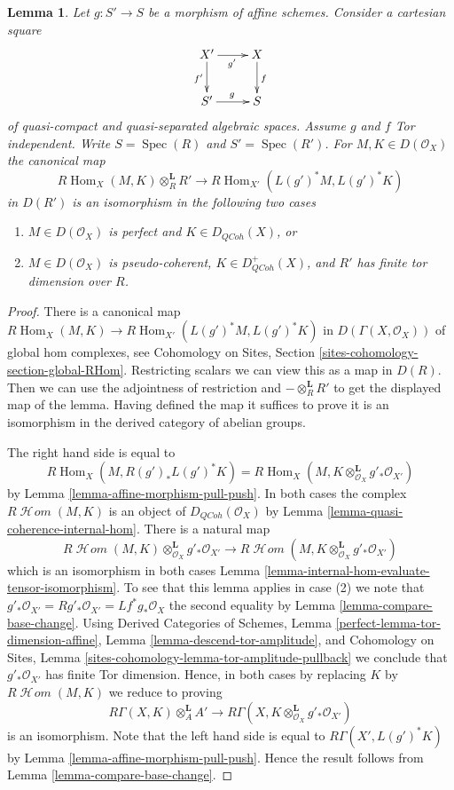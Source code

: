 \documentclass[10pt,a4paper]{amsart}
\theoremstyle{plain}
\newtheorem{lemma}[subsection]{Lemma}
\theoremstyle{definition}
\theoremstyle{remark}
\numberwithin{equation}{subsection}
\def\Spec{\mathop{\mathrm{Spec}}}
\def\Hom{\mathop{\mathrm{Hom}}\nolimits}
\def\SheafHom{\mathop{\mathcal{H}\!\mathit{om}}\nolimits}
\def\QCoh{\mathit{QCoh}}
\begin{document}
\begin{lemma}
\label{lemma-affine-morphism-and-hom-out-of-perfect}
Let $g : S' \to S$ be a morphism of affine schemes.
Consider a cartesian square
$$
\xymatrix{
X' \ar[r]_{g'} \ar[d]_{f'} & X \ar[d]^f \\
S' \ar[r]^g & S
}
$$
of quasi-compact and quasi-separated algebraic spaces. Assume $g$ and $f$
Tor independent. Write $S = \Spec(R)$ and $S' = \Spec(R')$. For
$M, K \in D(\mathcal{O}_X)$ the canonical map
$$
R\Hom_X(M, K) \otimes^\mathbf{L}_R R'
\longrightarrow
R\Hom_{X'}(L(g')^*M, L(g')^*K)
$$
in $D(R')$ is an isomorphism in the following two cases
\begin{enumerate}
\item $M \in D(\mathcal{O}_X)$ is perfect and $K \in D_\QCoh(X)$, or
\item $M \in D(\mathcal{O}_X)$ is pseudo-coherent,
$K \in D_\QCoh^+(X)$, and $R'$ has finite tor dimension over $R$.
\end{enumerate}
\end{lemma}

\begin{proof}
There is a canonical map
$R\Hom_X(M, K) \to R\Hom_{X'}(L(g')^*M, L(g')^*K)$
in $D(\Gamma(X, \mathcal{O}_X))$ of global hom complexes, see
Cohomology on Sites, Section \ref{sites-cohomology-section-global-RHom}.
Restricting scalars we can view this as a map in $D(R)$.
Then we can use the adjointness of restriction and
$- \otimes_R^\mathbf{L} R'$ to get the displayed map of the lemma.
Having defined the map it suffices to prove it is an isomorphism
in the derived category of abelian groups.

\medskip\noindent
The right hand side is equal to
$$
R\Hom_X(M, R(g')_*L(g')^*K) =
R\Hom_X(M, K \otimes_{\mathcal{O}_X}^\mathbf{L} g'_*\mathcal{O}_{X'})
$$
by Lemma \ref{lemma-affine-morphism-pull-push}. In both cases the complex
$R\SheafHom(M, K)$ is an object of $D_\QCoh(\mathcal{O}_X)$ by
Lemma \ref{lemma-quasi-coherence-internal-hom}. There is a natural map
$$
R\SheafHom(M, K) \otimes_{\mathcal{O}_X}^\mathbf{L} g'_*\mathcal{O}_{X'}
\longrightarrow
R\SheafHom(M, K \otimes_{\mathcal{O}_X}^\mathbf{L} g'_*\mathcal{O}_{X'})
$$
which is an isomorphism in both cases
Lemma \ref{lemma-internal-hom-evaluate-tensor-isomorphism}.
To see that this lemma applies in case (2) we note that
$g'_*\mathcal{O}_{X'} = Rg'_*\mathcal{O}_{X'} =
Lf^*g_*\mathcal{O}_X$ the second equality by
Lemma \ref{lemma-compare-base-change}.
Using Derived Categories of Schemes, Lemma
\ref{perfect-lemma-tor-dimension-affine},
Lemma \ref{lemma-descend-tor-amplitude}, and
Cohomology on Sites, Lemma \ref{sites-cohomology-lemma-tor-amplitude-pullback}
we conclude that $g'_*\mathcal{O}_{X'}$ has finite Tor dimension.
Hence, in both cases by replacing $K$ by $R\SheafHom(M, K)$ we reduce
to proving
$$
R\Gamma(X, K) \otimes^\mathbf{L}_A A' \longrightarrow
R\Gamma(X, K \otimes^\mathbf{L}_{\mathcal{O}_X} g'_*\mathcal{O}_{X'})
$$
is an isomorphism.
Note that the left hand side is equal to $R\Gamma(X', L(g')^*K)$
by Lemma \ref{lemma-affine-morphism-pull-push}.
Hence the result follows from
Lemma \ref{lemma-compare-base-change}.
\end{proof}
\end{document}
